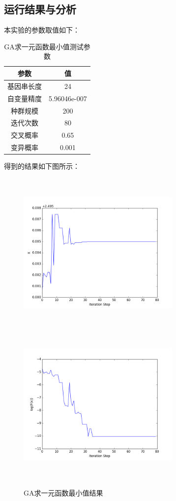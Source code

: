 \documentclass[UTF8]{ctexart}
\begin{document}
\subsection{运行结果与分析}
本实验的参数取值如下：
\begin{table}[htbp]\centering
\begin{tabular}{cc}
  \toprule
  参数 & 值 \\
  \midrule
  基因串长度 & 24 \\
  自变量精度 & 5.96046e-007\\
  种群规模   & 200 \\
  迭代次数   & 80 \\
  交叉概率   & 0.65 \\
  变异概率   & 0.001 \\
  \bottomrule
\end{tabular}
\caption{GA求一元函数最小值测试参数}
\end{table}

\indent 得到的结果如下图所示：
\begin{figure}[htbp]\centering
\includegraphics [width=8cm,height=8cm]{../pic/T1-1_res_x.png} 
\includegraphics [width=8cm,height=8cm]{../pic/T1-1_res_fx.png} 
\caption{GA求一元函数最小值结果}
\end{figure}
\end{document}
